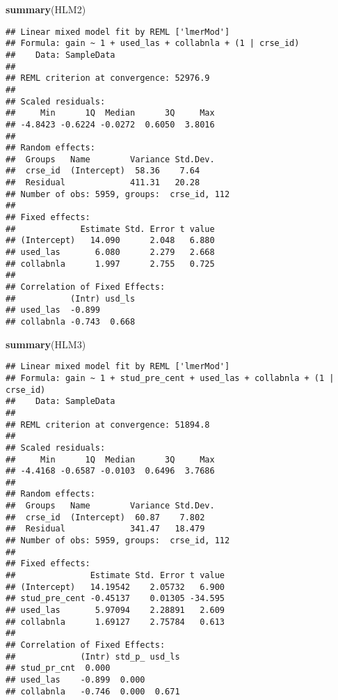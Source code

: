 \documentclass[]{article}
\newenvironment{Shaded}{\begin{snugshade}}{\end{snugshade}}
\newcommand{\KeywordTok}[1]{\textcolor[rgb]{0.13,0.29,0.53}{\textbf{#1}}}
\newcommand{\NormalTok}[1]{#1}
\begin{document}
\begin{Shaded}
\begin{Highlighting}[]
\KeywordTok{summary}\NormalTok{(HLM2)}
\end{Highlighting}
\end{Shaded}

\begin{verbatim}
## Linear mixed model fit by REML ['lmerMod']
## Formula: gain ~ 1 + used_las + collabnla + (1 | crse_id)
##    Data: SampleData
## 
## REML criterion at convergence: 52976.9
## 
## Scaled residuals: 
##     Min      1Q  Median      3Q     Max 
## -4.8423 -0.6224 -0.0272  0.6050  3.8016 
## 
## Random effects:
##  Groups   Name        Variance Std.Dev.
##  crse_id  (Intercept)  58.36    7.64   
##  Residual             411.31   20.28   
## Number of obs: 5959, groups:  crse_id, 112
## 
## Fixed effects:
##             Estimate Std. Error t value
## (Intercept)   14.090      2.048   6.880
## used_las       6.080      2.279   2.668
## collabnla      1.997      2.755   0.725
## 
## Correlation of Fixed Effects:
##           (Intr) usd_ls
## used_las  -0.899       
## collabnla -0.743  0.668
\end{verbatim}

\begin{Shaded}
\begin{Highlighting}[]
\KeywordTok{summary}\NormalTok{(HLM3)}
\end{Highlighting}
\end{Shaded}

\begin{verbatim}
## Linear mixed model fit by REML ['lmerMod']
## Formula: gain ~ 1 + stud_pre_cent + used_las + collabnla + (1 | crse_id)
##    Data: SampleData
## 
## REML criterion at convergence: 51894.8
## 
## Scaled residuals: 
##     Min      1Q  Median      3Q     Max 
## -4.4168 -0.6587 -0.0103  0.6496  3.7686 
## 
## Random effects:
##  Groups   Name        Variance Std.Dev.
##  crse_id  (Intercept)  60.87    7.802  
##  Residual             341.47   18.479  
## Number of obs: 5959, groups:  crse_id, 112
## 
## Fixed effects:
##               Estimate Std. Error t value
## (Intercept)   14.19542    2.05732   6.900
## stud_pre_cent -0.45137    0.01305 -34.595
## used_las       5.97094    2.28891   2.609
## collabnla      1.69127    2.75784   0.613
## 
## Correlation of Fixed Effects:
##             (Intr) std_p_ usd_ls
## stud_pr_cnt  0.000              
## used_las    -0.899  0.000       
## collabnla   -0.746  0.000  0.671
\end{verbatim}
\end{document}
